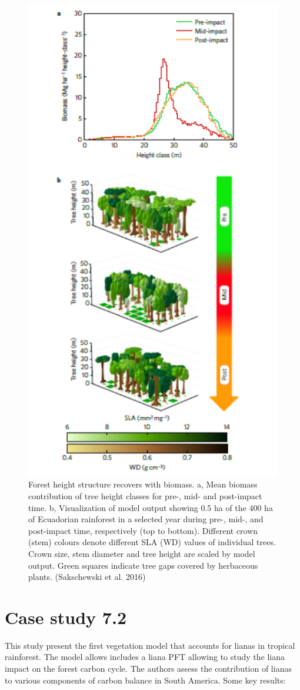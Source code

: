 \documentclass[12pt,oneside]{book}
\begin{document}
\begin{figure}

{\centering \includegraphics[width=0.6\linewidth]{figures/chap7/f721_lpjML_2} 

}

\caption{Forest height structure recovers with biomass. a, Mean biomass contribution of tree height classes for pre-, mid- and post-impact time. b, Visualization of model output showing 0.5 ha of the 400 ha of Ecuadorian rainforest in a selected year during pre-, mid-, and post-impact time, respectively (top to bottom). Different crown (stem) colours denote different SLA (WD) values of individual trees. Crown size, stem diameter and tree height are scaled by model output. Green squares indicate tree gaps covered by herbaceous plants. (Sakschewski et al. 2016)}\label{fig:f721}
\end{figure}

\section{Case study 7.2}\label{case-study-7.2}

This study present the first vegetation model that accounts for lianas
in tropical rainforest. The model allows includes a liana PFT allowing
to study the liana impact on the forest carbon cycle. The authors assess
the contribution of lianas to various components of carbon balance in
South America. Some key results:
\end{document}
